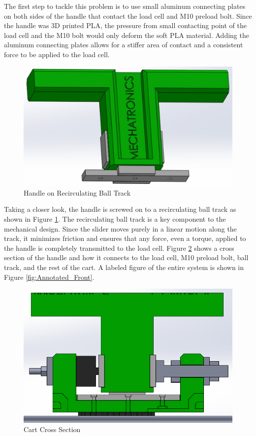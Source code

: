 The first step to tackle this problem is to use small aluminum connecting plates on both sides of the handle that contact the load cell and M10 preload bolt. Since the handle was 3D printed PLA, the pressure from small contacting point of the load cell and the M10 bolt would only deform the soft PLA material. Adding the aluminum connecting plates allows for a stiffer area of contact and a consistent force to be applied to the load cell.

\begin{figure}[h]
	\centering
	\includegraphics[width=0.8\columnwidth]{Images/Recirculating_Ball_Track}
	\caption{Handle on Recirculating Ball Track}
	\label{fig:Recirculating_Ball_Track}
\end{figure}

Taking a closer look, the handle is screwed on to a recirculating ball track as shown in Figure \ref{fig:Recirculating_Ball_Track}. The recirculating ball track is a key component to the mechanical design. Since the slider moves purely in a linear motion along the track, it minimizes friction and ensures that any force, even a torque, applied to the handle is completely transmitted to the load cell. Figure \ref{fig:Ball_Track_Cross_Section} shows a cross section of the handle and how it connects to the load cell, M10 preload bolt, ball track, and the rest of the cart. A labeled figure of the entire system is shown in Figure \ref{fig:Annotated_Front}.


\begin{figure}[h]
\centering
\includegraphics[width=0.8\columnwidth]{Images/Ball_Track_Cross_Section}
\caption{Cart Cross Section}
\label{fig:Ball_Track_Cross_Section}
\end{figure}

